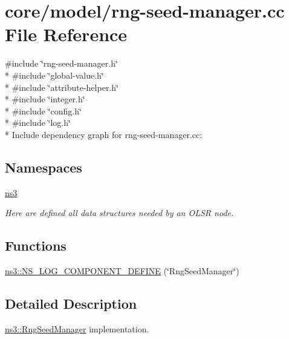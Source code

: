 \hypertarget{rng-seed-manager_8cc}{}\section{core/model/rng-\/seed-\/manager.cc File Reference}
\label{rng-seed-manager_8cc}
{\ttfamily \#include \char`\"{}rng-\/seed-\/manager.\+h\char`\"{}}\\*
{\ttfamily \#include \char`\"{}global-\/value.\+h\char`\"{}}\\*
{\ttfamily \#include \char`\"{}attribute-\/helper.\+h\char`\"{}}\\*
{\ttfamily \#include \char`\"{}integer.\+h\char`\"{}}\\*
{\ttfamily \#include \char`\"{}config.\+h\char`\"{}}\\*
{\ttfamily \#include \char`\"{}log.\+h\char`\"{}}\\*
Include dependency graph for rng-\/seed-\/manager.cc\+:
\subsection*{Namespaces}
\begin{DoxyCompactItemize}
\item 
 \hyperlink{namespacens3}{ns3}
\begin{DoxyCompactList}\small\item\em Here are defined all data structures needed by an O\+L\+SR node. \end{DoxyCompactList}\end{DoxyCompactItemize}
\subsection*{Functions}
\begin{DoxyCompactItemize}
\item 
\hyperlink{namespacens3_a9b0d2c0f1dc238516cf8af5419a9a5f7}{ns3\+::\+N\+S\+\_\+\+L\+O\+G\+\_\+\+C\+O\+M\+P\+O\+N\+E\+N\+T\+\_\+\+D\+E\+F\+I\+NE} (\char`\"{}Rng\+Seed\+Manager\char`\"{})
\end{DoxyCompactItemize}


\subsection{Detailed Description}
\hyperlink{classns3_1_1RngSeedManager}{ns3\+::\+Rng\+Seed\+Manager} implementation. 